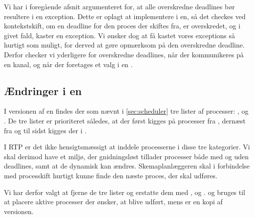 Vi har i foregående afsnit argumenteret for, at alle overskredne deadlines bør resultere i en exception. Dette er oplagt at implementere i \sched en, så det checkes ved kontekstskift, om en deadline for den proces der skiftes fra, er overskredet, og i givet fald, kaster en exception. Vi ønsker dog at få kastet vores exceptions så hurtigt som muligt, for derved at gøre opmærksom på den overskredne deadline. Derfor checker vi yderligere for overskredne deadlines, når der kommunikeres på en kanal, og når der foretages et valg i en . 

\subsection{Ændringer i \sched en}
\label{sec:sched-changes}
I  versionen af \sched en findes der som nævnt i \cref{sec:scheduler} tre lister af processer: ,  og . De tre lister er prioriteret således, at der først kigges på processer fra , dernæst fra  og til sidst kigges der i .

I RTP er det ikke hensigtsmæssigt at inddele processerne i disse tre  kategorier. Vi skal derimod have et miljø, der gnidningsløst tillader processer både med og uden deadlines, samt at de dynamisk kan ændres. Skemaplanlæggeren skal i forbindelse med processkift hurtigt kunne finde den næste proces, der skal udføres.

Vi har derfor valgt at fjerne  de tre lister og erstatte dem  med ,   og .  og    bruges til at placere  aktive processer der ønsker, at blive udført, mens   er en kopi af \des versionen. 


